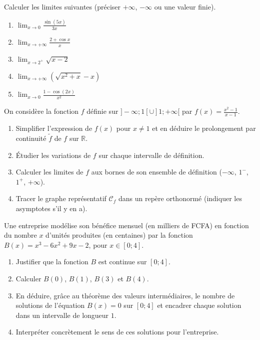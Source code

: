 \documentclass[11pt]{article}
\begin{document}
\begin{exercice}
\noindent Calculer les limites suivantes (préciser $+\infty$, $-\infty$ ou une valeur finie).
\begin{enumerate}
    \item $\lim_{x\to 0} \frac{\sin(5x)}{3x}$
    \item $\lim_{x\to +\infty} \frac{2+\cos x}{x}$
    \item $\lim_{x\to 2^+} \sqrt{x-2}$
    \item $\lim_{x\to +\infty} \left(\sqrt{x^2+x}-x\right)$
    \item $\lim_{x\to 0} \frac{1-\cos(2x)}{x^2}$
\end{enumerate}
\end{exercice}

\begin{exercice}
\noindent On considère la fonction $f$ définie sur $]-\infty;1[\cup]1;+\infty[$ par $f(x)=\frac{x^2-1}{x-1}$.
\begin{enumerate}
    \item Simplifier l'expression de $f(x)$ pour $x\neq 1$ et en déduire le prolongement par continuité $\tilde{f}$ de $f$ sur $\mathbb{R}$.
    \item Étudier les variations de $f$ sur chaque intervalle de définition.
    \item Calculer les limites de $f$ aux bornes de son ensemble de définition ($-\infty$, $1^-$, $1^+$, $+\infty$).
    \item Tracer le graphe représentatif $\mathcal{C}_f$ dans un repère orthonormé (indiquer les asymptotes s'il y en a).
\end{enumerate}
\end{exercice}

\begin{exercice}
\noindent Une entreprise modélise son bénéfice mensuel (en milliers de FCFA) en fonction du nombre $x$ d'unités produites (en centaines) par la fonction $B(x)=x^3-6x^2+9x-2$, pour $x\in[0;4]$.
\begin{enumerate}
    \item Justifier que la fonction $B$ est continue sur $[0;4]$.
    \item Calculer $B(0)$, $B(1)$, $B(3)$ et $B(4)$.
    \item En déduire, grâce au théorème des valeurs intermédiaires, le nombre de solutions de l'équation $B(x)=0$ sur $[0;4]$ et encadrer chaque solution dans un intervalle de longueur $1$.
    \item Interpréter concrètement le sens de ces solutions pour l'entreprise.
\end{enumerate}
\end{exercice}
\end{document}

